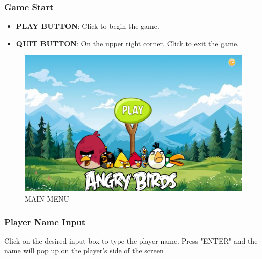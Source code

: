 \documentclass{article}
\begin{document}
\subsubsection{Game Start}


\begin{itemize}
    \item \textbf{PLAY BUTTON}: Click to begin the game.
    \item \textbf{QUIT BUTTON}: On the upper right corner. Click to exit the game.
\end{itemize}

\begin{figure}[h!]
    \centering
    \includegraphics[width = 1.0\textwidth]{play_button.png}
    \caption{MAIN MENU}
    \label{fig:MAIN_MENU}
\end{figure}


\subsubsection{Player Name Input} 
Click on the desired input box to type the player name. 
Press "ENTER" and the name will pop up on the player's side of the screen
\end{document}
